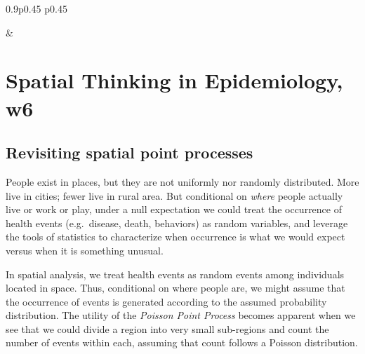 \documentclass[
]{book}
\begin{document}
\begin{table}[ht]
\begin{centerbox}
\begin{threeparttable}
\begin{tabularx}{0.9\textwidth}{p{} p{}}

 &
 \tabularnewline[-0.5pt]


\end{tabularx}
\end{threeparttable}\par\end{centerbox}

\end{table}
 

\hypertarget{spatial-thinking-in-epidemiology-w6}{%
\section{Spatial Thinking in Epidemiology, w6}\label{spatial-thinking-in-epidemiology-w6}}

\hypertarget{revisiting-spatial-point-processes}{%
\subsection{Revisiting spatial point processes}\label{revisiting-spatial-point-processes}}

People exist in places, but they are not uniformly nor randomly distributed. More live in cities; fewer live in rural area. But conditional on \emph{where} people actually live or work or play, under a null expectation we could treat the occurrence of health events (e.g.~disease, death, behaviors) as random variables, and leverage the tools of statistics to characterize when occurrence is what we would expect versus when it is something unusual.

In spatial analysis, we treat health events as random events among individuals located in space. Thus, conditional on where people are, we might assume that the occurrence of events is generated according to the assumed probability distribution. The utility of the \emph{Poisson Point Process} becomes apparent when we see that we could divide a region into very small sub-regions and count the number of events within each, assuming that count follows a Poisson distribution.
\end{document}
